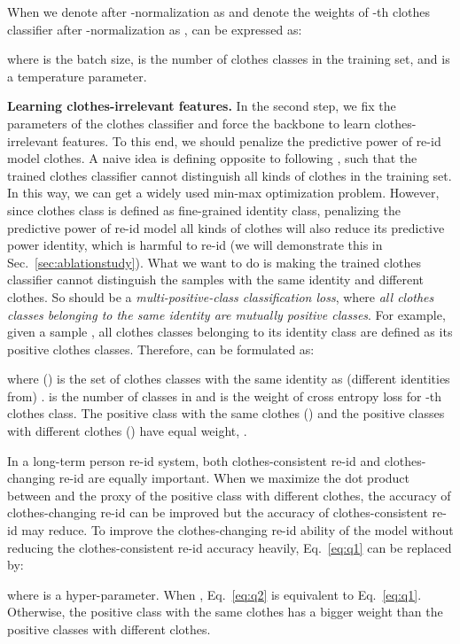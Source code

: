 \documentclass[10pt,twocolumn,letterpaper]{article}
\begin{document}
When we denote  after -normalization as  and denote the weights of -th clothes classifier after -normalization as ,  can be expressed as:

where  is the batch size,  is the number of clothes classes in the training set, and  is a temperature parameter.

\medskip
\noindent
\textbf{Learning clothes-irrelevant features.} 
In the second step, we fix the parameters of the clothes classifier and force the backbone to learn clothes-irrelevant features. 
To this end, we should penalize the predictive power of re-id model \wrt clothes. 
A naive idea is defining  opposite to  following \cite{Wang2019LearningRobust}, such that the trained clothes classifier cannot distinguish all kinds of clothes in the training set.
In this way, we can get a widely used min-max optimization problem.
However, since clothes class is defined as fine-grained identity class, penalizing the predictive power of re-id model \wrt all kinds of clothes will also reduce its predictive power \wrt identity, which is harmful to re-id (we will demonstrate this in Sec.~\ref{sec:ablationstudy}).
What we want to do is making the trained clothes classifier cannot distinguish the samples with the same identity and different clothes.
So  should be a \emph{multi-positive-class classification loss}, where \emph{all clothes classes belonging to the same identity are mutually positive classes}.
For example, given a sample , all clothes classes belonging to its identity class  are defined as its positive clothes classes.
Therefore,  can be formulated as:


where   () is the set of clothes classes with the same identity as (different identities from) .
 is the number of classes in  and  is the weight of cross entropy loss for -th clothes class.
The positive class with the same clothes () and the positive classes with different clothes () have equal weight, \ie .

In a long-term person re-id system, both clothes-consistent re-id and clothes-changing re-id are equally important.
When we maximize the dot product between  and the proxy of the positive class with different clothes, the accuracy of clothes-changing re-id can be improved but the accuracy of clothes-consistent re-id may reduce. 
To improve the clothes-changing re-id ability of the model without reducing the clothes-consistent re-id accuracy heavily, Eq.~\eqref{eq:q1} can be replaced by:

where  is a hyper-parameter.
When , Eq.~\eqref{eq:q2} is equivalent to Eq.~\eqref{eq:q1}.
Otherwise, the positive class with the same clothes has a bigger weight than the positive classes with different clothes.
\end{document}
